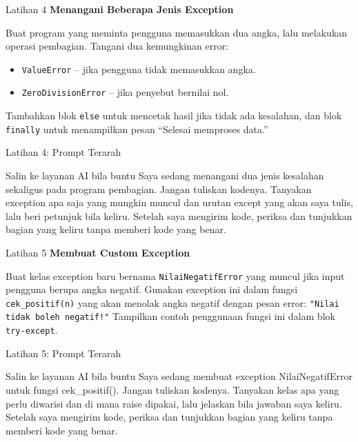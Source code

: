 \documentclass[aspectratio=169, table]{beamer}
\begin{document}
\begin{frame}[fragile,allowframebreaks=0.8]{Latihan 4}
\footnotesize
\textbf{Menangani Beberapa Jenis Exception}\par\medskip
Buat program yang meminta pengguna memasukkan dua angka, lalu melakukan operasi pembagian.  
    Tangani dua kemungkinan error:
    \begin{itemize}
        \item \texttt{ValueError} – jika pengguna tidak memasukkan angka.
        \item \texttt{ZeroDivisionError} – jika penyebut bernilai nol.
    \end{itemize}
    Tambahkan blok \texttt{else} untuk mencetak hasil jika tidak ada kesalahan, dan blok \texttt{finally} untuk menampilkan pesan “Selesai memproses data.”
\end{frame}

\begin{frame}{Latihan 4: Prompt Terarah}
\begin{block}{Salin ke layanan AI bila buntu}
\small Saya sedang menangani dua jenis kesalahan sekaligus pada program pembagian. Jangan tuliskan kodenya. Tanyakan exception apa saja yang mungkin muncul dan urutan except yang akan saya tulis, lalu beri petunjuk bila keliru. Setelah saya mengirim kode, periksa dan tunjukkan bagian yang keliru tanpa memberi kode yang benar.
\end{block}
\end{frame}

\begin{frame}[fragile,allowframebreaks=0.8]{Latihan 5}
\footnotesize
\textbf{Membuat Custom Exception}\par\medskip
Buat kelas exception baru bernama \texttt{NilaiNegatifError} yang muncul jika input pengguna berupa angka negatif.  
    Gunakan exception ini dalam fungsi \texttt{cek\_positif(n)} yang akan menolak angka negatif dengan pesan error:  
    \texttt{"Nilai tidak boleh negatif!"}  
    Tampilkan contoh penggunaan fungsi ini dalam blok \texttt{try-except}.
\end{frame}

\begin{frame}{Latihan 5: Prompt Terarah}
\begin{block}{Salin ke layanan AI bila buntu}
\small Saya sedang membuat exception NilaiNegatifError untuk fungsi cek\_positif(). Jangan tuliskan kodenya. Tanyakan kelas apa yang perlu diwarisi dan di mana raise dipakai, lalu jelaskan bila jawaban saya keliru. Setelah saya mengirim kode, periksa dan tunjukkan bagian yang keliru tanpa memberi kode yang benar.
\end{block}
\end{frame}
\end{document}
